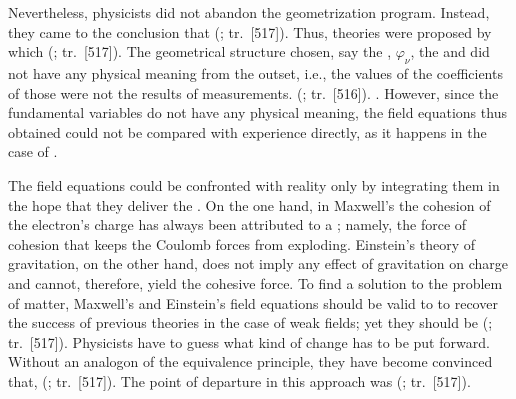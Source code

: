 \documentclass[draft]{article}
\newcommand{\phin}{\ensuremath{\varphi_\nu}\xspace}
\renewcommand{\rzlap}[2]{(\cite[#1]{Reichenbach1928}; tr.\ [#2])\xspace}
\begin{document}
Nevertheless, physicists did not abandon the geometrization program. Instead, they came to the conclusion that  \rzlap{371}{517}. Thus, theories were proposed by  which  \rzlap{371}{517}. The geometrical structure chosen, say the \Gtmn, \phin, the \Gtmn and \gmn\etc did not have any physical meaning from the outset, i.e., the values of the coefficients of those were not the results of measurements.  \rzlap{369}{516}. . However, since the fundamental variables do not have any physical meaning, the field equations thus obtained could not be compared with experience directly, as it happens in the case of \gr.

The field equations could be confronted with reality only by integrating them in the hope that they deliver the . On the one hand, in Maxwell's \ed the cohesion of the electron's charge has always been attributed to a ; namely, the force of cohesion that keeps the Coulomb forces from exploding. Einstein's theory of gravitation, on the other hand, does not imply any effect of gravitation on charge and cannot, therefore, yield the cohesive force. To find a solution to the problem of matter, Maxwell's and Einstein's field equations should be valid to  to recover the success of previous theories in the case of weak fields; yet they should be  \rzlap{370}{517}. Physicists have to guess what kind of change has to be put forward. Without an analogon of the equivalence principle, they have become convinced that, \q{[\textins{i}n this \scare{guessing}, the geometrical interpretation of electricity is supposed to be the guide} \rzlap{371}{517}. The point of departure in this approach was  \rzlap{370}{517}. 
\end{document}
